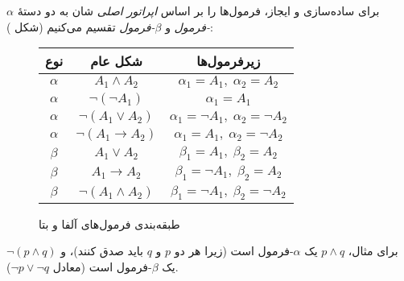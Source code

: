   برای ساده‌سازی و ایجاز، فرمول‌ها را بر اساس \emph{اپراتور اصلی} شان به دو دستهٔ \emph{$\alpha$-فرمول} و \emph{$\beta$-فرمول} تقسیم می‌کنیم (شکل ):
  
  \begin{figure}[ht]
  \centering
  \begin{tabular}{|c|c|c|}
  \hline
  نوع & شکل عام & زیرفرمول‌ها \\
  \hline
  $\alpha$ & $A_1 \land A_2$ & $\alpha_1 = A_1,\;\alpha_2 = A_2$ \\
  $\alpha$ & $\neg(\neg A_1)$ & $\alpha_1 = A_1$ \\
  $\alpha$ & $\neg(A_1 \lor A_2)$ & $\alpha_1 = \neg A_1,\;\alpha_2 = \neg A_2$ \\
  $\alpha$ & $\neg(A_1 \to A_2)$ & $\alpha_1 = A_1,\;\alpha_2 = \neg A_2$ \\
  \hline
  $\beta$ & $A_1 \lor A_2$ & $\beta_1 = A_1,\;\beta_2 = A_2$ \\
  $\beta$ & $A_1 \to A_2$ & $\beta_1 = \neg A_1,\;\beta_2 = A_2$ \\
  $\beta$ & $\neg(A_1 \land A_2)$ & $\beta_1 = \neg A_1,\;\beta_2 = \neg A_2$ \\
  \hline
  \end{tabular}
  \renewcommand{\thefigure}{\lr{2.8}}
  \caption{طبقه‌بندی فرمول‌های آلفا و بتا}
  \end{figure}
  
  برای مثال، $p \land q$ یک $\alpha$-فرمول است (زیرا هر دو $p$ و $q$ باید صدق کنند)، و $\neg(p \land q)$ یک $\beta$-فرمول است (معادل $\neg p \lor \neg q$).
  
